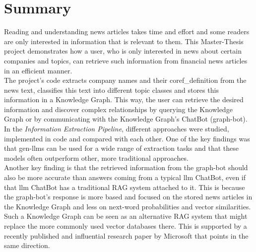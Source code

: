\documentclass[
DIV=calc,
a4paper,
fontsize=12pt
]{scrreprt}   %
\begin{document}
\chapter*{Summary}
Reading and understanding news articles takes time and effort and some readers are only interested in information that is relevant to them.
This Master-Thesis project demonstrates how a user, who is only interested in news about certain companies and topics, can retrieve such information from financial news articles in an efficient manner.\\

The project’s code extracts company names and their \gls{coref_definition} from the news text, classifies this text into different topic classes and stores this information in a Knowledge Graph.
This way, the user can retrieve the desired information and discover complex relationships by querying the Knowledge Graph or by communicating with the Knowledge Graph’s ChatBot (\gls{graph-bot}).\\

In the \emph{Information Extraction Pipeline}, different approaches were studied, implemented in code and compared with each other.
One of the key findings was that \glspl{gen-llm} can be used for a wide range of extraction tasks and that these models often outperform other, more traditional approaches.\\

Another key finding is that the retrieved information from the \gls{graph-bot} should also be more accurate than answers coming from a typical \gls{llm} ChatBot, even if that \gls{llm} ChatBot has a traditional \gls{RAG} system attached to it.
This is because the \gls{graph-bot}’s response is more based and focused on the stored news articles in the Knowledge Graph and less on next-word probabilities and vector similarities.\\

Such a Knowledge Graph can be seen as an alternative \gls{RAG} system that might replace the more commonly used vector databases there.
This is supported by a recently published and influential research paper by Microsoft \cite{graphrag} that points in the same direction.

\printnoidxglossaries

\tableofcontents

\end{document}
